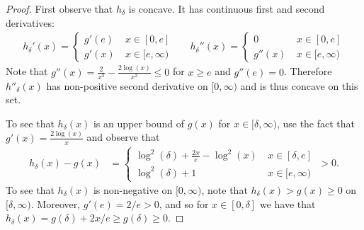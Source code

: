 \begin{proof}
First observe that $h_{\delta}$ is concave.
It has continuous first and second derivatives:
\begin{align*}
    h_{\delta}'(x) = \begin{cases} 
    g'(e) & \: x \in [0, e]\\
    g'(x) & \: x \in [e, \infty)
    \end{cases}
    &&
    h_{\delta}''(x) = \begin{cases} 
    0 & \: x \in [0, e]\\
    g''(x) & \: x \in [e, \infty)
    \end{cases}
\end{align*}
Note that $g''(x) = \frac{2}{x^2} - \frac{2 \log(x)}{x^2} \leq 0$ for $x \geq e$ and $g''(e) = 0$.
Therefore $h''_{\delta}(x)$ has non-positive second derivative on $[0, \infty)$ and is thus concave on this set.

To see that $h_{\delta}(x)$ is an upper bound of $g(x)$ for $x \in [\delta, \infty)$, use the fact that $g'(x) = \frac{2\log(x)}{x}$ and observe that
\begin{align*}
    h_{\delta}(x) - g(x)
    &= \begin{cases} 
    \log^2(\delta) + \frac{2x}{e} - \log^2(x)& \: x \in [\delta, e]\\
    \log^2(\delta) + 1& \: x \in [e, \infty)
    \end{cases}
    \ > 0.
\end{align*}
%
To see that $h_{\delta}(x)$ is non-negative on $[0, \infty)$, note that $h_{\delta}(x) > g(x) \geq 0$ on $[\delta, \infty)$. 
Moreover, $g'(e) = 2/e > 0$, and so for $x \in [0, \delta]$ we have that $h_{\delta}(x) = g(\delta) + 2x/e \geq g(\delta) \geq 0$.
\end{proof}

\medskip

